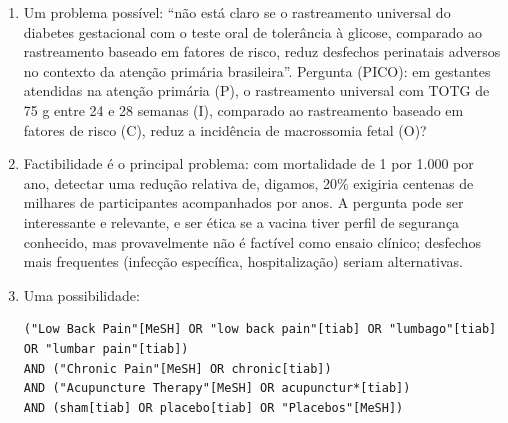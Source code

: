\documentclass[
]{book}
\begin{document}
\begin{enumerate}
\def\labelenumi{\arabic{enumi}.}
\item
  Um problema possível: ``não está claro se o rastreamento universal do diabetes gestacional com o teste oral de tolerância à glicose, comparado ao rastreamento baseado em fatores de risco, reduz desfechos perinatais adversos no contexto da atenção primária brasileira''. Pergunta (PICO): em gestantes atendidas na atenção primária (P), o rastreamento universal com TOTG de 75 g entre 24 e 28 semanas (I), comparado ao rastreamento baseado em fatores de risco (C), reduz a incidência de macrossomia fetal (O)?
\item
  Factibilidade é o principal problema: com mortalidade de 1 por 1.000 por ano, detectar uma redução relativa de, digamos, 20\% exigiria centenas de milhares de participantes acompanhados por anos. A pergunta pode ser interessante e relevante, e ser ética se a vacina tiver perfil de segurança conhecido, mas provavelmente não é factível como ensaio clínico; desfechos mais frequentes (infecção específica, hospitalização) seriam alternativas.
\item
  Uma possibilidade:

\begin{verbatim}
("Low Back Pain"[MeSH] OR "low back pain"[tiab] OR "lumbago"[tiab] OR "lumbar pain"[tiab])
AND ("Chronic Pain"[MeSH] OR chronic[tiab])
AND ("Acupuncture Therapy"[MeSH] OR acupunctur*[tiab])
AND (sham[tiab] OR placebo[tiab] OR "Placebos"[MeSH])
\end{verbatim}


\end{enumerate}
\end{document}
